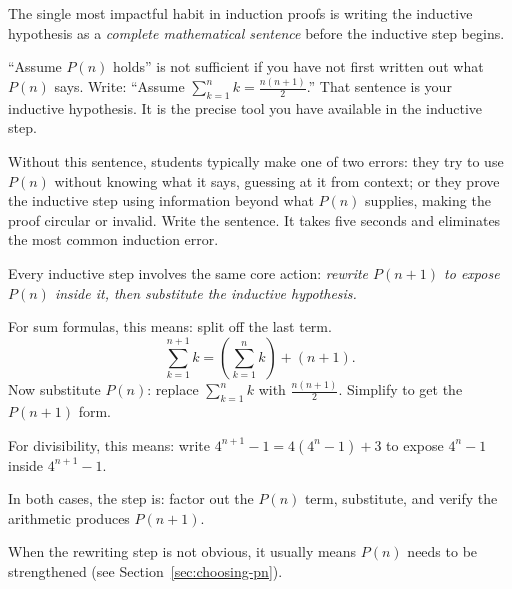 \begin{remark}
The single most impactful habit in induction proofs is writing the
inductive hypothesis as a \emph{complete mathematical sentence}
before the inductive step begins.

``Assume $P(n)$ holds'' is not sufficient if you have not first written
out what $P(n)$ says. Write: ``Assume
$\sum_{k=1}^n k = \frac{n(n+1)}{2}$.'' That sentence is your
inductive hypothesis. It is the precise tool you have available in
the inductive step.

Without this sentence, students typically make one of two errors:
they try to use $P(n)$ without knowing what it says, guessing at it
from context; or they prove the inductive step using information
beyond what $P(n)$ supplies, making the proof circular or invalid.
Write the sentence. It takes five seconds and eliminates the
most common induction error.
\end{remark}

\begin{remark}
Every inductive step involves the same core action: \emph{rewrite
$P(n+1)$ to expose $P(n)$ inside it, then substitute the inductive
hypothesis.}

For sum formulas, this means: split off the last term.
\[
\sum_{k=1}^{n+1} k = \left(\sum_{k=1}^n k\right) + (n+1).
\]
Now substitute $P(n)$: replace $\sum_{k=1}^n k$ with $\frac{n(n+1)}{2}$.
Simplify to get the $P(n+1)$ form.

For divisibility, this means: write $4^{n+1} - 1 = 4(4^n - 1) + 3$
to expose $4^n - 1$ inside $4^{n+1} - 1$.

In both cases, the step is: factor out the $P(n)$ term, substitute,
and verify the arithmetic produces $P(n+1)$.

When the rewriting step is not obvious, it usually means $P(n)$ needs
to be strengthened (see Section~\ref{sec:choosing-pn}).
\end{remark}

